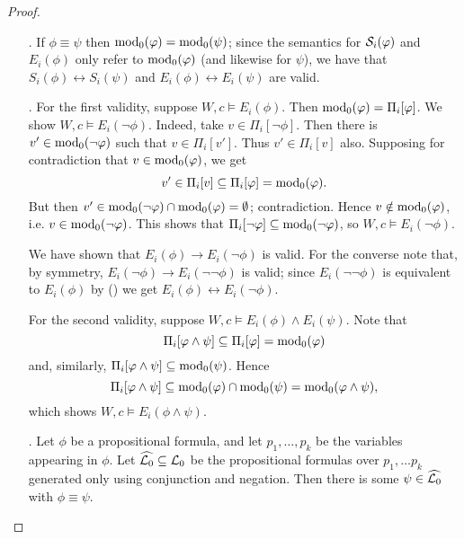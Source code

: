 \begin{proof}\leavevmode
\begin{itemize}
    \item[\labelcref{item:replacement_equivalents_e_s}.]
        If $\phi \equiv \psi$ then $\propmods(\phi) = \propmods(\psi)$; since
        the semantics for $\S_i(\phi)$ and $E_i(\phi)$ only refer to
        $\propmods(\phi)$ (and likewise for $\psi$), we have that $S_i(\phi)
        \leftrightarrow S_i(\psi)$ and $E_i(\phi) \leftrightarrow E_i(\psi)$
        are valid.

    \item[\labelcref{item:e_symmetric}.]
        For the first validity, suppose $W, c \models E_i(\phi)$. Then
        $\propmods(\phi) = \Pi_i[\phi]$. We show $W, c \models E_i(\neg\phi)$.
        Indeed, take $v \in \Pi_i[\neg\phi]$. Then there is $v' \in
        \propmods(\neg\phi)$ such that $v \in \Pi_i[v']$. Thus $v' \in
        \Pi_i[v]$ also. Supposing for contradiction that $v \in
        \propmods(\phi)$, we get
        \[
            v' \in \Pi_i[v] \subseteq \Pi_i[\phi] = \propmods(\phi).
        \]
        But then $v' \in \propmods(\neg\phi) \cap \propmods(\phi) = \emptyset$;
        contradiction. Hence $v \notin \propmods(\phi)$, i.e. $v \in
        \propmods(\neg\phi)$. This shows that $\Pi_i[\neg\phi] \subseteq
        \propmods(\neg\phi)$, so $W, c \models E_i(\neg\phi)$.

        We have shown that $E_i(\phi) \rightarrow E_i(\neg\phi)$ is valid. For
        the converse note that, by symmetry, $E_i(\neg\phi) \rightarrow
        E_i(\neg\neg\phi)$ is valid; since $E_i(\neg\neg\phi)$ is equivalent to
        $E_i(\phi)$ by () we get
        $E_i(\phi) \leftrightarrow E_i(\neg\phi)$.

        For the second validity, suppose $W, c \models E_i(\phi) \land
        E_i(\psi)$. Note that
        \[
            \Pi_i[\phi \land \psi]
            \subseteq \Pi_i[\phi]
            = \propmods(\phi)
        \]
        and, similarly, $\Pi_i[\phi \land \psi] \subseteq \propmods(\psi)$.
        Hence
        \[
            \Pi_i[\phi \land \psi]
            \subseteq \propmods(\phi) \cap \propmods(\psi)
            = \propmods(\phi \land \psi),
        \]
        which shows $W, c \models E_i(\phi \land \psi)$.

    \item[\labelcref{item:exp_on_all_variables}.]
        Let $\phi$ be a propositional formula, and let $p_1, \ldots, p_k$ be
        the variables appearing in $\phi$. Let $\widehat{\lprop} \subseteq
        \lprop$ be the propositional formulas over $p_1, \ldots p_k$ generated
        only using conjunction and negation. Then there is some $\psi \in
        \widehat{\lprop}$ with $\phi \equiv \psi$.


\end{itemize}
\end{proof}
